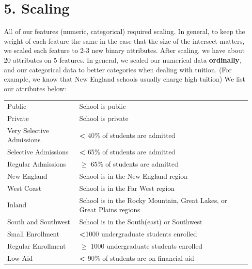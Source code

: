 \documentclass[12pt, a4, epsf] {article}
\theoremstyle{plain}
\theoremstyle{definition}
\begin{document}
\section*{5. Scaling}
All of our features (numeric, categorical) required scaling. In general, to keep the weight of each feature the same in the case that the size of the intersect matters, we scaled each feature to 2-3 new binary attributes. After scaling, we have about 20 attributes on 5 features. In general, we scaled our numerical data \textbf{ordinally}, and our categorical data to better categories when dealing with tuition. (For example, we know that New England schools usually charge high tuition) We list our attributes below:\\
\begin{table}[htbp]
\begin{tabular}{ll}
Public                    & School is public                                                                  \\
Private                   & School is private                                                                 \\
Very Selective Admissions & \textbf{\textless{}} 40\% of students are admitted                                          \\
Selective Admissions      & \textbf{\textless{}} 65\% of students are admitted                                          \\
Regular Admissions        & $\geq$ 65\% of students are admitted                                      \\
New England               & School is in the New England region                                               \\
West Coast                & School is in the Far West region                                                  \\
Inland                    & School is in the Rocky Mountain, Great Lakes, or Great Plains regions             \\
South and Southwest                & School is in the South(east) or Southwest \\
Small Enrollment          & \textbf{\textless{}}1000 undergraduate students enrolled                                 \\
Regular Enrollment        & $\geq$ 1000 undergraduate students enrolled                            \\
Low Aid                   & \textbf{\textless{}} 90\% of students are on financial aid                                  \\

\end{tabular}
\end{table}
\end{document}
